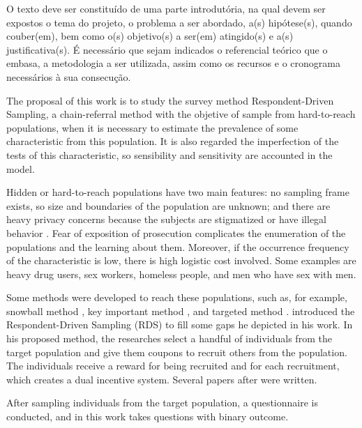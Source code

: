 \begin{citacao}
O texto deve ser constituído de uma parte introdutória, na qual devem ser
expostos o tema do projeto, o problema a ser abordado, a(s) hipótese(s),
quando couber(em), bem como o(s) objetivo(s) a ser(em) atingido(s) e a(s)
justificativa(s). É necessário que sejam indicados o referencial teórico que
o embasa, a metodologia a ser utilizada, assim como os recursos e o cronograma
necessários à sua consecução.
\end{citacao}

The proposal of this work is to study the survey method Respondent-Driven
Sampling, a chain-referral method with the objetive of sample from
hard-to-reach populations, when it is necessary to estimate the prevalence of
some characteristic from this population. It is also regarded the imperfection
of the tests of this characteristic, so sensibility and sensitivity are
accounted in the model.  

Hidden or hard-to-reach populations have two main features: no sampling frame
exists, so size and boundaries of the population are unknown; and there are
heavy privacy concerns because the subjects are stigmatized or have illegal
behavior \cite{heckathorn1997}. Fear of exposition of prosecution complicates
the enumeration of the populations and the learning about them. Moreover, if
the occurrence frequency of the characteristic is low, there is high logistic
cost involved. Some examples are heavy drug users, sex workers, homeless
people, and men who have sex with men. 

Some methods were developed to reach these populations, such as, for
example, snowball method \cite{goodman1961}, key important method
\cite{deaux-callaghan1985}, and targeted method \cite{watters-biernacki1989}.
\citeauthor{heckathorn1997} introduced the Respondent-Driven Sampling (RDS) to
fill some gaps he depicted in his work. In his proposed method, the researches
select a handful of individuals from the target population and give them
coupons to recruit others from the population. The individuals receive a
reward for being recruited and for each recruitment, which creates a dual
incentive system. Several papers after \citeyear{heckathorn1997} were written.

After sampling individuals from the target population, a questionnaire is
conducted, and in this work takes questions with binary outcome. 


